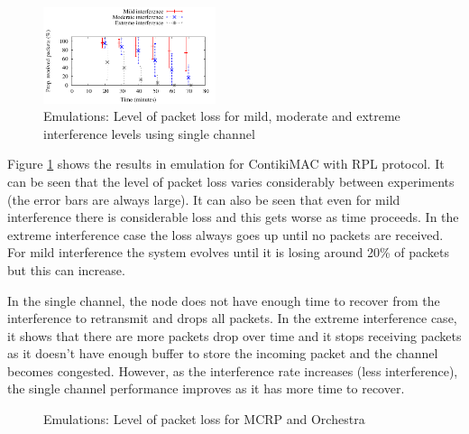 \begin{figure}
\centering
\includegraphics[width=0.45\textwidth]{figures/single_channel.pdf}
\caption{Emulations: Level of packet loss for mild, moderate and extreme interference levels using single channel}
\label{fig:interference}
\end{figure}

Figure \ref{fig:interference} shows the results in emulation for ContikiMAC with RPL protocol. It can be seen that the level of packet loss varies considerably between experiments (the error bars are always large). It can also be seen that even for mild interference there is considerable loss and this gets worse as time proceeds. In the extreme interference case the loss always goes up until no packets are received. For mild interference the system evolves until it is losing around 20\% of packets but this can increase.

In the single channel, the node does not have enough time to recover from the interference to retransmit and drops all packets. In the extreme interference case, it shows that there are more packets drop over time and it stops receiving packets as it doesn't have enough buffer to store the incoming packet and the channel becomes congested. However, as the interference rate increases (less interference), the single channel performance improves as it has more time to recover.

\begin{figure}
\centering
{}
\caption{Emulations: Level of packet loss for MCRP and Orchestra}
\label{fig:layouts}
\end{figure}


